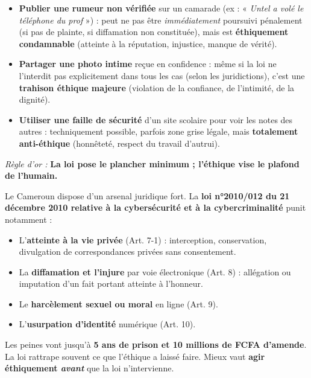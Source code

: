 \documentclass[11pt]{article}
\begin{document}
\begin{attention}
\begin{itemize}
    \item \textbf{Publier une rumeur non vérifiée} sur un camarade (ex : « \emph{Untel a volé le téléphone du prof} ») : peut ne pas être \emph{immédiatement} poursuivi pénalement (si pas de plainte, si diffamation non constituée), mais est \textbf{éthiquement condamnable} (atteinte à la réputation, injustice, manque de vérité).
    \item \textbf{Partager une photo intime} reçue en confidence : même si la loi ne l'interdit pas explicitement dans tous les cas (selon les juridictions), c'est une \textbf{trahison éthique majeure} (violation de la confiance, de l'intimité, de la dignité).
    \item \textbf{Utiliser une faille de sécurité} d'un site scolaire pour voir les notes des autres : techniquement possible, parfois zone grise légale, mais \textbf{totalement anti-éthique} (honnêteté, respect du travail d'autrui).
\end{itemize}
\emph{Règle d'or :} \textbf{La loi pose le plancher minimum ; l'éthique vise le plafond de l'humain.}
\end{attention}

\begin{savaistu}
Le Cameroun dispose d'un arsenal juridique fort. La \textbf{loi n°2010/012 du 21 décembre 2010 relative à la cybersécurité et à la cybercriminalité} punit notamment :
\begin{itemize}
    \item L'\textbf{atteinte à la vie privée} (Art. 7-1) : interception, conservation, divulgation de correspondances privées sans consentement.
    \item La \textbf{diffamation et l'injure} par voie électronique (Art. 8) : allégation ou imputation d'un fait portant atteinte à l'honneur.
    \item Le \textbf{harcèlement sexuel ou moral} en ligne (Art. 9).
    \item L'\textbf{usurpation d'identité} numérique (Art. 10).
\end{itemize}
Les peines vont jusqu'à \textbf{5 ans de prison et 10 millions de FCFA d'amende}. La loi rattrape souvent ce que l'éthique a laissé faire. Mieux vaut \textbf{agir éthiquement \emph{avant}} que la loi n'intervienne.
\end{savaistu}
\end{document}
